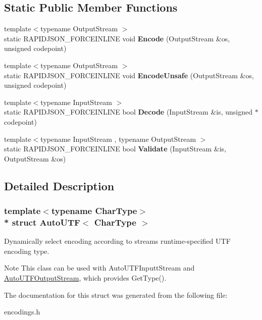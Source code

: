 \subsection*{Static Public Member Functions}
\begin{DoxyCompactItemize}
\item 
{\footnotesize template$<$typename Output\+Stream $>$ }\\static R\+A\+P\+I\+D\+J\+S\+O\+N\+\_\+\+F\+O\+R\+C\+E\+I\+N\+L\+I\+NE void {\bfseries Encode} (Output\+Stream \&os, unsigned codepoint)\hypertarget{a00040_a414946115261f886e74dd42cb4b98781}{}\label{a00040_a414946115261f886e74dd42cb4b98781}

\item 
{\footnotesize template$<$typename Output\+Stream $>$ }\\static R\+A\+P\+I\+D\+J\+S\+O\+N\+\_\+\+F\+O\+R\+C\+E\+I\+N\+L\+I\+NE void {\bfseries Encode\+Unsafe} (Output\+Stream \&os, unsigned codepoint)\hypertarget{a00040_a05f5dcd1f153b61b763e44ed452de251}{}\label{a00040_a05f5dcd1f153b61b763e44ed452de251}

\item 
{\footnotesize template$<$typename Input\+Stream $>$ }\\static R\+A\+P\+I\+D\+J\+S\+O\+N\+\_\+\+F\+O\+R\+C\+E\+I\+N\+L\+I\+NE bool {\bfseries Decode} (Input\+Stream \&is, unsigned $\ast$codepoint)\hypertarget{a00040_aa5e3c1dc23dbb75f6442ff69500a35b0}{}\label{a00040_aa5e3c1dc23dbb75f6442ff69500a35b0}

\item 
{\footnotesize template$<$typename Input\+Stream , typename Output\+Stream $>$ }\\static R\+A\+P\+I\+D\+J\+S\+O\+N\+\_\+\+F\+O\+R\+C\+E\+I\+N\+L\+I\+NE bool {\bfseries Validate} (Input\+Stream \&is, Output\+Stream \&os)\hypertarget{a00040_a36dd6f226d6a07c12161e21c0aff20b1}{}\label{a00040_a36dd6f226d6a07c12161e21c0aff20b1}

\end{DoxyCompactItemize}


\subsection{Detailed Description}
\subsubsection*{template$<$typename Char\+Type$>$\\*
struct Auto\+U\+T\+F$<$ Char\+Type $>$}

Dynamically select encoding according to stream\textquotesingle{}s runtime-\/specified U\+TF encoding type. 

\begin{DoxyNote}{Note}
This class can be used with Auto\+U\+T\+F\+Inputt\+Stream and \hyperlink{a00042}{Auto\+U\+T\+F\+Output\+Stream}, which provides Get\+Type(). 
\end{DoxyNote}


The documentation for this struct was generated from the following file\+:\begin{DoxyCompactItemize}
\item 
encodings.\+h\end{DoxyCompactItemize}
